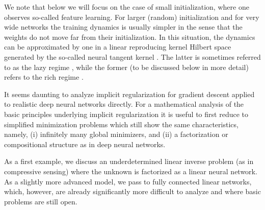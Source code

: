 \documentclass{svproc}
\newcommand{\0}{\boldsymbol{0}}
\newcommand{\1}{\boldsymbol{1}}
\begin{document}
We note that below we will focus on the case of small initialization, where one observes so-called feature learning. For larger (random) initialization and for very wide networks the training dynamics is usually simpler in the sense that the weights do not move far from their initialization. In this situation, the dynamics can be approximated by one in a linear reproducing kernel Hilbert space generated by the so-called neural tangent kernel \cite{jacot2018ntk}. The latter is sometimes referred to as the lazy regime \cite{ch19}, while the former (to be discussed below in more detail) refers to the rich regime \cite{wo20}.

\medskip

It seems daunting to analyze implicit regularization for gradient descent applied to realistic deep neural networks directly. For a mathematical analysis of the basic principles underlying implicit regularization it is useful to first reduce to simplified minimization problems which still show the same characteristics, namely, (i) infinitely many global minimizers, and (ii) a factorization or compositional structure as in deep neural networks.

As a first example, we discuss an underdetermined linear inverse problem (as in compressive sensing) where the unknown is factorized as a linear neural network.
As a slightly more advanced model, we pass to fully connected linear networks, which, however, are already significantly more difficult to analyze and where basic problems are still open.
\end{document}
